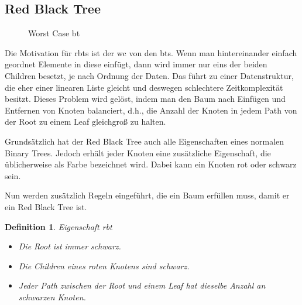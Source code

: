 \documentclass[11pt]{article}
\newtheorem{definition}{Definition}
\begin{document}
\subsection{Red Black Tree}

\begin{figure}
  \centering
\caption{Worst Case \gls{bt}}
\vspace{-50pt}
\end{figure}

Die Motivation für \glspl{rbt} ist der \gls{wc} von den \glspl{bt}. 
Wenn man hintereinander einfach geordnet Elemente in diese einfügt, dann wird immer nur eins der beiden Children besetzt, je nach Ordnung der Daten.
Das führt zu einer Datenstruktur, die eher einer linearen Liste gleicht und deswegen schlechtere Zeitkomplexität besitzt. Dieses Problem wird gelöst, indem man den Baum nach Einfügen und Entfernen von Knoten balanciert,
d.h., die Anzahl der Knoten in jedem Path von der Root zu einem Leaf gleichgroß zu halten.

Grundsätzlich hat der Red Black Tree auch alle Eigenschaften eines normalen Binary Trees. Jedoch erhält jeder Knoten eine zusätzliche Eigenschaft, die üblicherweise als Farbe bezeichnet wird.
Dabei kann ein Knoten rot oder schwarz sein.

Nun werden zusätzlich Regeln eingeführt, die ein Baum erfüllen muss, damit er ein Red Black Tree ist.

\begin{definition}{Eigenschaft \gls{rbt}}
  
\begin{itemize}
  \item[1.] Die Root ist immer schwarz.
  \item[2.] Die Children eines roten Knotens sind schwarz.
  \item[3.] Jeder Path zwischen der Root und einem Leaf hat dieselbe Anzahl an schwarzen Knoten. 
\end{itemize}

\end{definition}
\end{document}
